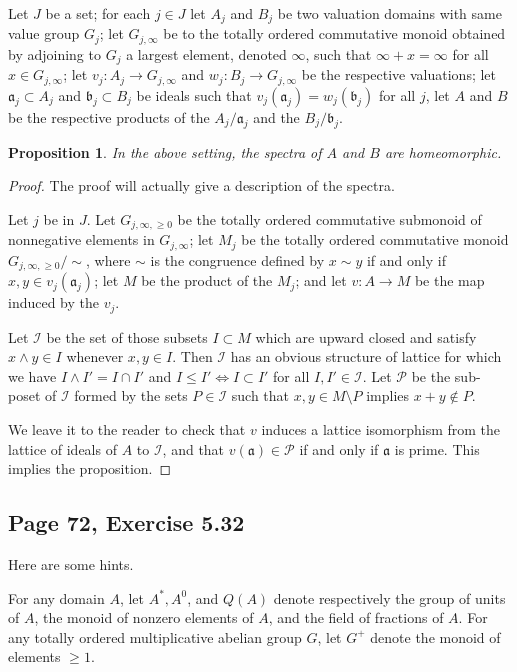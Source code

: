 \documentclass[parskip=half,fontsize=12pt]{scrartcl}%
\newcommand{\mf}{\mathfrak}
\newcommand{\aaa}{\mf a}
\newcommand{\bbb}{\mf b}
\newtheorem{prop}[thm]{Proposition}
\begin{document}
Let $J$ be a set; for each $j\in J$ let $A_j$ and $B_j$ be two valuation domains with same value group $G_j$; let $G_{j,\infty}$ be to the totally ordered commutative monoid obtained by adjoining to $G_j$ a largest element, denoted $\infty$, such that $\infty+x=\infty$ for all $x\in G_{j,\infty}$; let $v_j:A_j\to G_{j,\infty}$ and $w_j:B_j\to G_{j,\infty}$ be the respective valuations; let $\aaa_j\subset A_j$ and $\bbb_j\subset B_j$ be ideals such that $v_j(\aaa_j)=w_j(\bbb_j)$ for all $j$, let $A$ and $B$ be the respective products of the $A_j/\aaa_j$ and the $B_j/\bbb_j$.

\begin{prop}
In the above setting, the spectra of $A$ and $B$ are homeomorphic.
\end{prop}

\begin{proof}
The proof will actually give a description of the spectra. 

Let $j$ be in $J$. Let $G_{j,\infty,\ge0}$ be the totally ordered commutative submonoid of nonnegative elements in $G_{j,\infty}$; let $M_j$ be the totally ordered commutative monoid $G_{j,\infty,\ge0}/\!\sim$, where $\sim$ is the congruence defined by $x\sim y$ if and only if $x,y\in v_j(\aaa_j)$; let $M$ be the product of the $M_j$; and let $v:A\to M$ be the map induced by the $v_j$. 

Let $\mathcal I$ be the set of those subsets $I\subset M$ which are upward closed and satisfy $x\land y\in I$ whenever $x,y\in I$. Then $\mathcal I$ has an obvious structure of lattice for which we have $I\land I'=I\cap I'$ and $I\le I'\iff I\subset I'$ for all $I,I'\in\mathcal I$. Let $\mathcal P$ be the sub-poset of $\mathcal I$ formed by the sets $P\in\mathcal I$ such that $x,y\in M\setminus P$ implies $x+y\notin P$.

We leave it to the reader to check that $v$ induces a lattice isomorphism from the lattice of ideals of $A$ to $\mathcal I$, and that $v(\aaa)\in\mathcal P$ if and only if $\aaa$ is prime. This implies the proposition. 
\end{proof}

\subsection{Page 72, Exercise 5.32}%

Here are some hints.

For any domain $A$, let $A^*,A^0$, and $Q(A)$ denote respectively the group of units of $A$, the monoid of nonzero elements of $A$, and the field of fractions of $A$. For any totally ordered multiplicative abelian group $G$, let $G^+$ denote the monoid of elements $\ge1$. 
\end{document}
